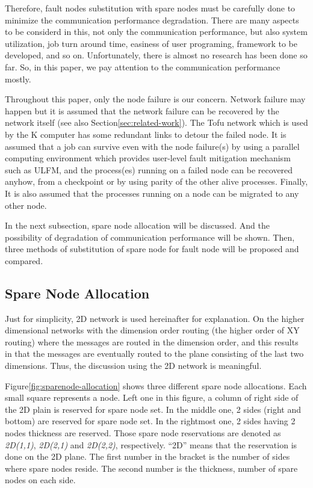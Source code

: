 \documentclass[10pt,conference,a4paper,fleqn]{IEEEtran}
\begin{document}
Therefore, fault nodes substitution with spare nodes must be
carefully done to minimize the communication performance
degradation. There are many aspects to be considerd in this, not only
the communication performance, but also system utilization, job turn
around time, easiness of user programing, framework to be developed,
and so on. Unfortunately, there is almost no research has been done so
far. So, in this paper, we pay attention to the communication
performance mostly. 

Throughout this paper, only the node failure is our concern. Network
failure may happen but it is assumed that the network failure can be
recovered by the network itself\cite{Domke:2014:FND:2683593.2683659}
(see also Section\ref{sec:related-work}). The Tofu network which is
used by the K computer has some redundant links to detour the failed
node\cite{sumimoto-k}. It is assumed that a job can survive even with
the node failure(s) by using a parallel computing environment which
provides user-level fault mitigation mechanism such as ULFM, and the
process(es) running on a failed node can be recovered anyhow, from a
checkpoint or by using parity of the other alive processes. Finally,
It is also assumed that the processes running on a node can be
migrated to any other node.  

In the next subsection, spare node allocation will be discussed. And 
the possibility of degradation of communication performance will be
shown. Then, three methods of substitution of spare node for fault
node will be proposed and compared. 

\subsection{Spare Node Allocation}\label{sec:spare-alloc}

Just for simplicity, 2D network is used hereinafter for
explanation. On the higher dimensional networks with the dimension
order routing (the higher order of XY
routing\cite{Zhang:2009:CRX:1603897.1605067}) where the messages are 
routed in the dimension order, and this results in that the messages
are eventually routed to the plane consisting of the last two
dimensions. Thus, the discussion using the 2D network is meaningful. 

Figure\ref{fig:sparenode-allocation} shows three different spare node
allocations. Each small square represents a node. Left one in this figure,
a column of right side of the 2D plain is reserved for spare node
set. In the middle one, 2 sides (right and bottom) are reserved for
spare node set. In the rightmost one, 2 sides having 2 nodes thickness
are reserved. Those spare node reservations are denoted as {\it
  2D(1,1)}, {\it 2D(2,1)} and {\it 2D(2,2)}, respectively. ``2D''
means that the reservation is done on the 2D plane. The first number
in the bracket is the number of sides where spare nodes reside. The
second number is the thickness, number of spare nodes on each side. 
\end{document}
